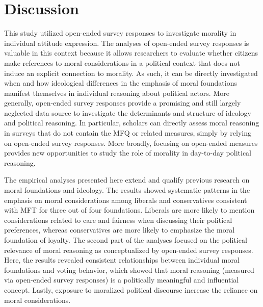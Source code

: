 \documentclass[12pt]{article}
\begin{document}
\section*{Discussion}


This study utilized open-ended survey responses to investigate morality in individual attitude expression. The analyses of open-ended survey responses is valuable in this context because it allows researchers to evaluate whether citizens make references to moral considerations in a political context that does not induce an explicit connection to morality. As such, it can be directly investigated when and how ideological differences in the emphasis of moral foundations manifest themselves in individual reasoning about political actors. More generally, open-ended survey responses provide a promising and still largely neglected data source to investigate the determinants and structure of ideology and political reasoning. In particular, scholars can directly assess moral reasoning in surveys that do not contain the MFQ or related measures, simply by relying on open-ended survey responses. More broadly, focusing on open-ended measures provides new opportunities to study the role of morality in day-to-day political reasoning.

The empirical analyses presented here extend and qualify previous research on moral foundations and ideology. The results showed systematic patterns in the emphasis on moral considerations among liberals and conservatives consistent with MFT for three out of four foundations. Liberals are more likely to mention considerations related to care and fairness when discussing their political preferences, whereas conservatives are more likely to emphasize the moral foundation of loyalty. The second part of the analyses focused on the political relevance of moral reasoning as conceptualized by open-ended survey responses. Here, the results revealed consistent relationships between individual moral foundations and voting behavior, which showed that moral reasoning (measured via open-ended survey responses) is a politically meaningful and influential concept. Lastly, exposure to moralized political discourse increase the reliance on moral considerations. 
\end{document}
